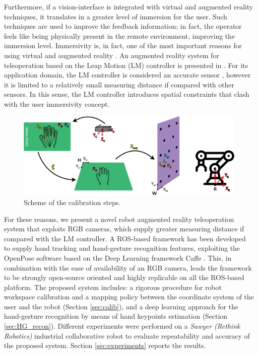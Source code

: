 \documentclass[a4paper, 10 pt, conference]{ieeeconf}      %
\begin{document}
Furthermore, if a vision-interface is integrated with virtual and augmented reality techniques, it translates in a greater level of immersion for the user. Such techniques are used to improve the feedback information; in fact, the operator feels like being physically present in the remote environment, improving the immersion level. Immersivity is, in fact, one of the most important reasons for using virtual and augmented reality \cite{Boboc2012}.
An augmented reality system for teleoperation based on the Leap Motion (LM) controller is presented in \cite{Peppoloni2015}. For its application domain, the LM controller is considered an accurate sensor \cite{Hedayati2018}, however it is limited to a relatively small measuring distance if compared with other sensors. In this sense, the LM controller introduces spatial constraints that clash with the user immersivity concept.

\begin{figure}[b!]
	\centering
	\includegraphics[width=1\textwidth]{figures/horizcalib}
	\caption{Scheme of the calibration steps.}
	\label{fig:wscalib}
\end{figure}

For these reasons, we present a novel robot augmented reality teleoperation system that exploits RGB cameras, which supply greater measuring distance if compared with the LM controller. A ROS-based framework has been developed to supply hand tracking and hand-gesture recognition features, exploiting the OpenPose software \cite{simon2017hand, cao2018openpose} based on the Deep Learning framework Caffe \cite{jia2014caffe}.
This, in combination with the ease of availability of an RGB camera, leads the framework to be strongly open-source oriented and highly replicable on all the ROS-based platform. The proposed system includes: a rigorous procedure for robot workspace calibration and a mapping policy between the coordinate system of the user and the robot (Section \ref{sec:calib}), and a deep learning approach for the hand-gesture recognition by means of hand keypoints estimation (Section \ref{sec:HG_recon}).
Different experiments were performed on a \textit{Sawyer (Rethink Robotics)} industrial collaborative robot to evaluate repeatability and accuracy of the proposed system. Section \ref{sec:experiments} reports the results.
\end{document}
